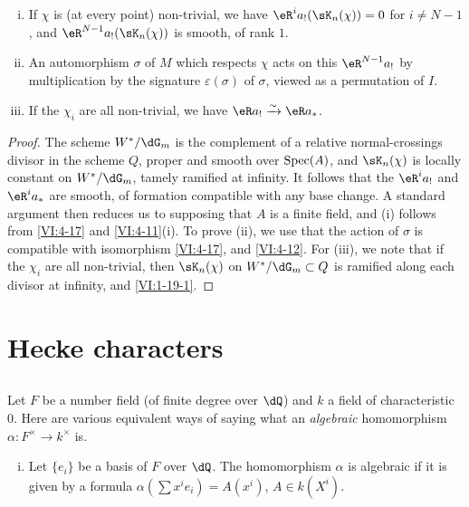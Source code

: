 \begin{proposition_}\label{VI:4-20}
\begin{enumerate}[(i)]
  \item If $\chi$ is (at every point) non-trivial, we have
    $\eR^i a_! (\sK_n(\chi)) = 0$ for $i\ne N-1$, and
    $\eR^{N-1} a_!(\sK_n(\chi))$ is smooth, of rank $1$.
  \item An automorphism $\sigma$ of $M$ which respects $\chi$ acts on this
    $\eR^{N-1} a_!$ by multiplication by the signature $\varepsilon(\sigma)$
    of $\sigma$, viewed as a permutation of $I$.
  \item If the $\chi_i$ are all non-trivial, we have $\eR a_! \iso \eR a_\ast$.
\end{enumerate}
\end{proposition_}
\begin{proof}[Proof]
The scheme $W^\ast/\dG_m$ is the complement of a relative normal-crossings
divisor in the scheme $Q$, proper and smooth over $\operatorname{Spec}(A)$, and
$\sK_n(\chi)$ is locally constant on $W^\ast/\dG_m$, tamely ramified
at infinity. It follows that the $\eR^i a_!$ and
$\eR^i a_\ast$ are smooth, of formation compatible with any base
change. A standard argument then reduces us to supposing that $A$ is a
finite field, and (i) follows from \ref{VI:4-17} and \ref{VI:4-11}(i). To
prove (ii), we use that the action of $\sigma$ is compatible with
isomorphism \ref{VI:4-17}, and \ref{VI:4-12}. For (iii), we note that if the
$\chi_i$ are all non-trivial, then $\sK_n(\chi)$ on
$W^\ast/\dG_m\subset Q$ is ramified along each divisor at infinity,
and \ref{VI:1-19-1}.
\end{proof}










\section{Hecke characters}\label{VI:5}





\subsection{}\label{VI:5-1}

Let $F$ be a number field (of finite degree over $\dQ$) and $k$ a field of
characteristic $0$. Here are various equivalent ways of saying what an
\emph{algebraic} homomorphism $\alpha:F^\times \to k^\times$ is.
\begin{enumerate}[(i)]
  \item Let $\{e_i\}$ be a basis of $F$ over $\dQ$. The homomorphism $\alpha$ is
    algebraic if it is given by a formula
    $\alpha(\sum x^i e_i) = A(x^i)$, $A\in k(X^i)$.
\end{enumerate}

